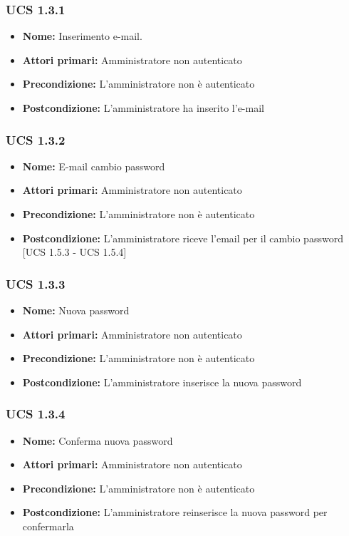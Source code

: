 \subsubsection{UCS 1.3.1}
\begin{itemize}
\item \textbf{Nome:} Inserimento e-mail.
\item \textbf{Attori primari:} Amministratore non autenticato
\item \textbf{Precondizione:}  L'amministratore non è autenticato %
\item \textbf{Postcondizione:} L'amministratore ha inserito l'e-mail
\end{itemize}

\subsubsection{UCS 1.3.2}
\begin{itemize}
\item \textbf{Nome:} E-mail cambio password
\item \textbf{Attori primari:} Amministratore non autenticato
\item \textbf{Precondizione:}  L'amministratore non è autenticato 
\item \textbf{Postcondizione:} L'amministratore riceve l'email per il cambio password [UCS 1.5.3 - UCS 1.5.4]
\end{itemize}

\subsubsection{UCS 1.3.3}
\begin{itemize}
\item \textbf{Nome:} Nuova password
\item \textbf{Attori primari:} Amministratore non autenticato
\item \textbf{Precondizione:}  L'amministratore non è autenticato 
\item \textbf{Postcondizione:} L'amministratore inserisce la nuova password
\end{itemize}

\subsubsection{UCS 1.3.4}
\begin{itemize}
\item \textbf{Nome:} Conferma nuova password
\item \textbf{Attori primari:} Amministratore non autenticato
\item \textbf{Precondizione:}  L'amministratore non è autenticato 
\item \textbf{Postcondizione:} L'amministratore reinserisce la nuova password per confermarla
\end{itemize}


